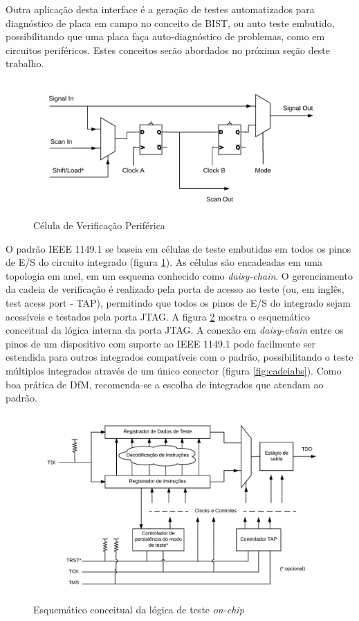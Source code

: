 Outra aplicação desta interface é a geração de testes automatizados para diagnóstico de placa em campo no conceito de BIST, ou auto teste embutido, possibilitando que uma placa faça auto-diagnóstico de problemas, como em circuitos periféricos. Estes conceitos serão abordados no próxima seção deste trabalho.

\begin{figure}
    \centering
        \includegraphics[width=0.8\linewidth]{fig/bscell}
            \caption{Célula de Verificação Periférica}
            \label{fig:bscell}
\end{figure}


O padrão IEEE 1149.1 se baseia em células de teste embutidas em todos os pinos de E/S do circuito integrado (figura \ref{fig:bscell}). As células são encadeadas em uma topologia em anel, em um esquema conhecido como \textit{daisy-chain}. O gerenciamento da cadeia de verificação é realizado pela porta de acesso ao teste (ou, em inglês, test acess port - TAP), permitindo que todos os pinos de E/S do integrado sejam acessíveis e testados pela porta JTAG. A figura \ref{fig:tap} mostra o esquemático conceitual da lógica interna da porta JTAG. A conexão em \textit{daisy-chain} entre os pinos de um dispositivo com suporte ao IEEE 1149.1 pode facilmente ser estendida para outros integrados compatíveis com o padrão, possibilitando o teste múltiplos integrados através de um único conector (figura \ref{fig:cadeiabs}). Como boa prática de DfM, recomenda-se a escolha de integrados que atendam ao padrão.

\begin{figure}
    \centering
        \includegraphics[width=1.0\linewidth]{fig/TAP}
            \caption{Esquemático conceitual da lógica de teste \textit{on-chip}}
            \label{fig:tap}
\end{figure}

